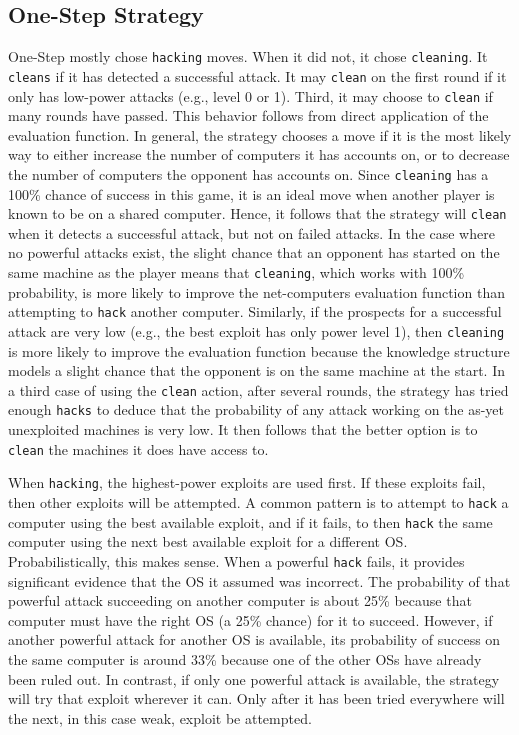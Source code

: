 \documentclass{sig-alternate}
\begin{document}
\subsection{One-Step Strategy}
One-Step mostly chose {\tt hacking} moves.
When it did not, it chose {\tt cleaning}.
It {\tt cleans} if it has detected a successful attack.
It may {\tt clean} on the first round if it only has low-power attacks (e.g., level 0 or 1).
Third, it may choose to {\tt clean} if many rounds have passed.
This behavior follows from direct application of the evaluation function.
In general, the strategy chooses a move if it is the most likely way to either increase the number of computers it has accounts on, or to decrease the number of computers the opponent has accounts on. Since {\tt cleaning} has a 100\% chance of success in this game, it is an ideal move when another player is known to be on a shared computer. 
Hence, it follows that the strategy will {\tt clean} when it detects a successful attack, but not on failed attacks. 
In the case where no powerful attacks exist, the slight chance that an opponent has started on the same machine as the player means that {\tt cleaning}, which works with 100\% probability, is more likely to improve the net-computers evaluation function than attempting to {\tt hack} another computer.
Similarly, if the prospects for a successful attack are very low (e.g., the best exploit has only power level 1), then {\tt cleaning} is more likely to improve the evaluation function because the knowledge structure models a slight chance that the opponent is on the same machine at the start.
In a third case of using the {\tt clean} action, after several rounds, the strategy has tried enough {\tt hacks} to deduce that the probability of any attack working on the as-yet unexploited machines is very low.
It then follows that the better option is to {\tt clean} the machines it does have access to.

When {\tt hacking}, the highest-power exploits are used first.
If these exploits fail, then other exploits will be attempted.
A common pattern is to attempt to {\tt hack} a computer using the best available exploit, and if it fails, to then {\tt hack} the same computer using the next best available exploit for a different OS.
Probabilistically, this makes sense. 
When a powerful {\tt hack} fails, it provides significant evidence that the OS it assumed was incorrect.
The probability of that powerful attack succeeding on another computer is about 25\% because that computer must have the right OS (a 25\% chance) for it to succeed.
However, if another powerful attack for another OS is available, its probability of success on the same computer is around 33\% because one of the other OSs have already been ruled out.
In contrast, if only one powerful attack is available, the strategy will try that exploit wherever it can.
Only after it has been tried everywhere will the next, in this case weak, exploit be attempted.
\end{document}
